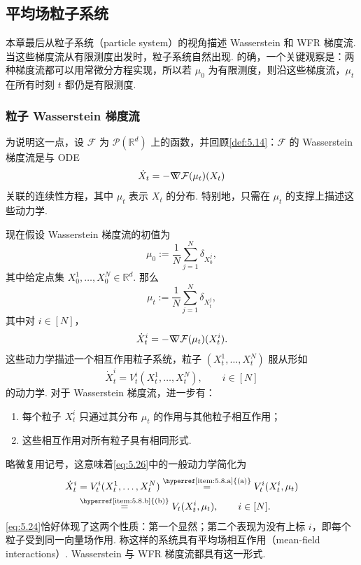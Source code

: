 \subsection{平均场粒子系统}\label{sec:5.8}

本章最后从粒子系统（particle system）的视角描述 Wasserstein 和 WFR 梯度流. 当这些梯度流从有限测度出发时，粒子系统自然出现. 的确，一个关键观察是：两种梯度流都可以用常微分方程实现，所以若 $\mu_0$ 为有限测度，则沿这些梯度流，$\mu_t$ 在所有时刻 $t$ 都仍是有限测度.

\subsubsection{粒子 Wasserstein 梯度流}\label{sec:5.8.1}

为说明这一点，设 $\mathcal F$ 为 $\mathcal P(\mathbb R^d)$ 上的函数，并回顾\autoref{def:5.14}：$\mathcal F$ 的 Wasserstein 梯度流是与 ODE
\begin{equation}\label{eq:5.24}
\dot X_t=-\nabla\mkern-10mu\nabla\mathcal F(\mu_t)(X_t)
\end{equation}
关联的连续性方程，其中 $\mu_t$ 表示 $X_t$ 的分布. 特别地，只需在 $\mu_t$ 的支撑上描述这些动力学.

现在假设 Wasserstein 梯度流的初值为
$$
\mu_0:=\frac1N\sum_{j=1}^N\delta_{X_0^j},
$$
其中给定点集 $X_0^1,\ldots,X_0^N\in\mathbb R^d$. 那么
$$
\mu_t:=\frac1N\sum_{j=1}^N\delta_{X_t^j},
$$
其中对 $i\in[N]$，
\begin{equation}\label{eq:5.25}
\dot X_t^i=-\nabla\mkern-10mu\nabla\mathcal F(\mu_t)(X_t^i).
\end{equation}
这些动力学描述一个相互作用粒子系统，粒子 $(X_t^1,\ldots,X_t^N)$ 服从形如
\begin{equation}\label{eq:5.26}
\dot X_t^i=V_t^i(X_t^1,\ldots,X_t^N),\qquad i\in[N]
\end{equation}
的动力学. 对于 Wasserstein 梯度流，进一步有：
\begin{enumerate}
\renewcommand{\labelenumi}{(\alph{enumi})}
\item\label{item:5.8.a} 每个粒子 $X_t^i$ 只通过其分布 $\mu_t$ 的作用与其他粒子相互作用；
\item\label{item:5.8.b} 这些相互作用对所有粒子具有相同形式.
\end{enumerate}
略微复用记号，这意味着\eqref{eq:5.26}中的一般动力学简化为
$$
\begin{aligned}
\dot X_t^i
&=V_t^i(X_t^1,\ldots,X_t^N)
\overset{\text{\hyperref[item:5.8.a]{(a)}}}=V_t^i(X_t^i,\mu_t)\\
&\overset{\text{\hyperref[item:5.8.b]{(b)}}}=V_t(X_t^i,\mu_t),\qquad i\in[N].
\end{aligned}
$$
\eqref{eq:5.24}恰好体现了这两个性质：第一个显然；第二个表现为没有上标 $i$，即每个粒子受到同一向量场作用. 称这样的系统具有平均场相互作用（mean-field interactions）. Wasserstein 与 WFR 梯度流都具有这一形式.

